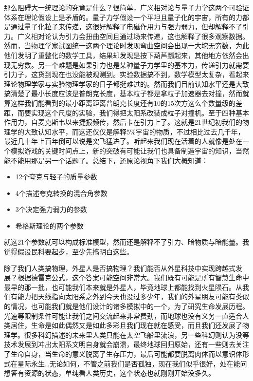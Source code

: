 \documentclass[
]{book}
\providecommand{\tightlist}{%
  \setlength{\itemsep}{0pt}\setlength{\parskip}{0pt}}
\begin{document}
那么阻碍大一统理论的究竟是什么？很简单，广义相对论与量子力学这两个可验证体系在理论假设上是矛盾的。量子力学假设一个平坦且量子化的宇宙，所有的力都是通过量子化粒子来传递，这很好解释了电磁作用力与强力弱力，但却解释不了引力。广义相对论认为引力会扭曲空间且通过场来传递，这也解释了很多观察数据。然而，当物理学家试图统一这两个理论时发现弯曲空间会出现一大坨无穷数，为此他们发明了重整化的数学工具，结果却发现是按下葫芦瓢起来，其他地方依然会出现无穷数。另一个难题是如果引力也是某种量子力学里的基本力，传递引力就需要引力子，这货到现在也没能被观测到。实验数据搞不到，数学模型太复杂，看起来理论物理学家与实验物理学家的日子都挺难过的。然而我们目前认知水平还是大致搞清楚了最小长度应该是普朗克长度，基本粒子都是拿粒子加速器去对撞，然而就算这样我们能看到的最小距离距离普朗克长度还有10的15次方这么个数量级的差距，而要实现这个尺度的实验，我们得把太阳系改装成粒子对撞机。至于四种基本作用力，自麦克斯韦以来捷报频传，然后卡在引力上了。这就是21世纪初我们的物理学的大致认知水平，而这还仅仅是解释5\%宇宙的物质，不过相比过去几千年，最近几十年上百年倒可以说是突飞猛进了。听起来我们现在活着的人就像是处在一个模拟游戏的关键时间点上，新的突破有可能让我们也具备制造宇宙的知识，当然能不能用那是另一个话题了。总结下，还原论视角下我们大概知道：

\begin{itemize}
\tightlist
\item
  12个夸克与轻子的质量参数
\item
  4个描述夸克转换的混合角参数
\item
  3个决定强力弱力的参数
\item
  希格斯理论的两个参数
\end{itemize}

就这21个参数就可以构成标准模型，然而还是解释不了引力、暗物质与暗能量。我觉得假设民科要起步，至少先搞明白这些。

除了我们人类搞物理，外星人是否搞物理？我们能否从外星科技中实现跨越式发展？根据德雷克公式，这个答案可能空间非常大。我们既有可能是所有智慧生命中最早的那一批，也可能我们本来就是外星人，毕竟地球上都能找到火星陨石。从我们有能力把天线指向太阳系之外到今天也没过多少年，我们的外星朋友可能有类似的情况，也可能我们就是他们设计的诸多模拟中的一个，为了研究生命发展历程。光速等限制条件可能让我们之间交流起来非常费劲，而地球也没有义务一直适合人类居住，生命是如此偶然又是如此多彩且我们现在就在感受，而且我们还发展了物理学。很多科幻描述的未来里人类只能在太空飞船里流浪，另一些科幻则认为没等技术发展到冲出太阳系文明自身就会崩溃，最终地球回归原始，还有一些则去关注了生命自身，当生命的意义脱离了生存压力，最后可能都要脱离肉体而以意识体形式在星际永生\ldots 无论如何，不管之前我们是否孤独，现在我们似乎很好，处在能问想答有资源的状态，单纯看人类历史，这个状态也就刚刚开始没多久。
\end{document}
